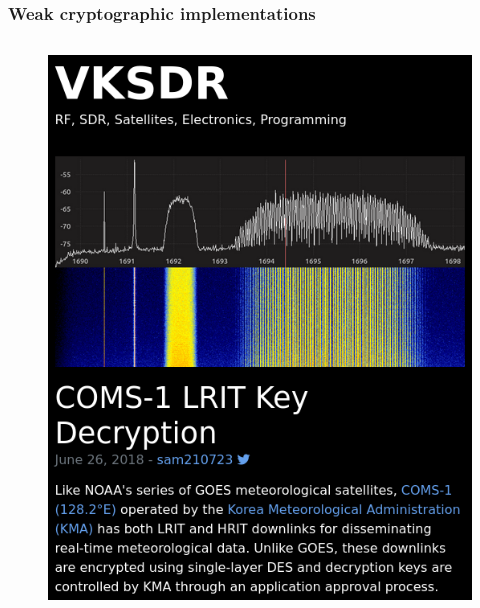 \documentclass{beamer}
\begin{document}
\begin{frame}
  \frametitle{Weak cryptographic implementations}
  \begin{columns}[t]
    \begin{column}{4cm}
      \begin{figure}
          \includegraphics[width=\columnwidth]{images/lrit-key-dec.png}
          \label{fig:lrit-key-dec}
      \end{figure}
    \end{column}


\end{columns}
\end{frame}
\end{document}
